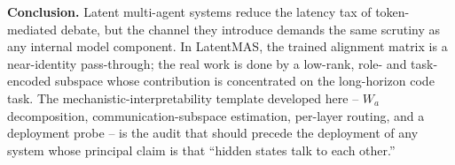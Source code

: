 \documentclass{article}
\begin{document}
\textbf{Conclusion.} Latent multi-agent systems reduce the latency tax of token-mediated debate, but the channel they introduce demands the same scrutiny as any internal model component. In LatentMAS, the trained alignment matrix is a near-identity pass-through; the real work is done by a low-rank, role- and task-encoded subspace whose contribution is concentrated on the long-horizon code task. The mechanistic-interpretability template developed here -- $W_a$ decomposition, communication-subspace estimation, per-layer routing, and a deployment probe -- is the audit that should precede the deployment of any system whose principal claim is that ``hidden states talk to each other.''

{\small


}
\end{document}
